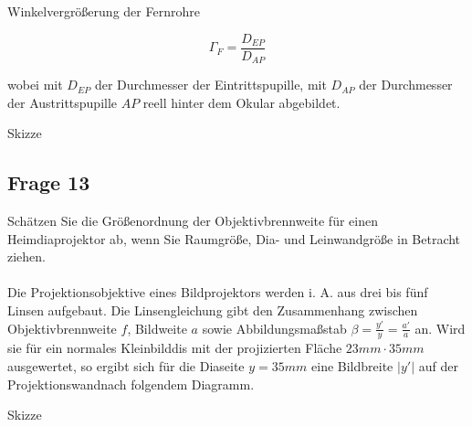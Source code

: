 \documentclass[a4paper,10pt]{scrartcl}
\begin{document}
		Winkelvergrößerung der Fernrohre

			\[\Gamma_F=\frac{D_{EP}}{D_{AP}}\]
	
		wobei mit $D_{EP}$ der Durchmesser der Eintrittspupille, mit $D_{AP}$ der Durchmesser der Austrittspupille $AP$ reell hinter dem Okular abgebildet.
		
			\begin{center}
			Skizze
			\end{center}
	\subsection{Frage 13}
		Schätzen Sie die Größenordnung der Objektivbrennweite für einen Heimdiaprojektor ab, wenn Sie Raumgröße, Dia- und Leinwandgröße in Betracht ziehen.
		\\
		\\
		Die Projektionsobjektive eines Bildprojektors werden i. A. aus drei bis fünf Linsen aufgebaut. Die Linsengleichung gibt den Zusammenhang zwischen Objektivbrennweite $f$, Bildweite $a$ sowie Abbildungsmaßstab $\beta=\frac{y'}{y}=\frac{a'}{a}$ an. Wird sie für ein normales Kleinbilddis mit der projizierten Fläche $23 mm \cdot 35 mm$ ausgewertet, so ergibt sich für die Diaseite $y=35 mm$ eine Bildbreite $\left|y'\right|$ auf der Projektionswandnach folgendem Diagramm.
	
			\begin{center}
			Skizze
			\end{center}
		
	
\end{document}
